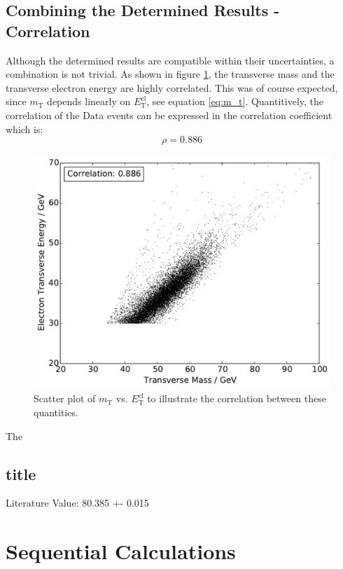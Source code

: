 \documentclass[
	paper=A4,
	parskip=full,
	chapterprefix=true,
	11pt,
	headings=normal,
	bibliography=totoc,
	listof=totoc,
	titlepage=on,
]{scrreprt}
\newcommand{\ELET}{\ensuremath{{E_\mathrm{T}^\mathrm{el}}}\xspace}
\newcommand{\MT}{\ensuremath{{m_\mathrm{T}}}\xspace}
\begin{document}
\section{Combining the Determined Results - Correlation}
Although the determined results are compatible within their uncertainties, a combination is not trivial. As shown in figure \ref{fig:corr}, the transverse mass and the transverse electron energy are highly correlated. This was of course expected, since \MT depends linearly on \ELET, see equation \ref{eq:m_t}. Quantitively, the correlation of the Data events can be expressed in the correlation coefficient which is:
\begin{equation}
\rho=0.886
\end{equation}
\begin{figure}
	\centering
	\includegraphics{correlation}
	\caption{Scatter plot of \MT vs. \ELET to illustrate the correlation between these quantities.}
	\label{fig:corr}
\end{figure}
The 
\section{title}
Literature Value: 80.385 +- 0.015 \\   


\chapter{Sequential Calculations}
\end{document}
